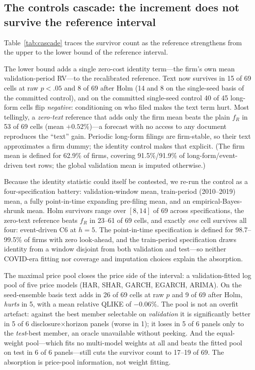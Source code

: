 \subsection{The controls cascade: the increment does not survive the reference interval}
\label{sec:results-cascade}

Table~\ref{tab:cascade} traces the survivor count as the reference strengthens from the upper to the lower bound of the reference interval.

The lower bound adds a single zero-cost identity term---the firm's own mean validation-period RV---to the recalibrated reference. Text now survives in 15 of 69 cells at raw $p<.05$ and 8 of 69 after Holm (14 and 8 on the single-seed basis of the committed control), and on the committed single-seed control 40 of 45 long-form cells flip \emph{negative}: conditioning on who filed makes the text term hurt. Most tellingly, a \emph{zero-text} reference that adds only the firm mean beats the plain $f_R$ in 53 of 69 cells (mean $+0.52\%$)---a forecast with no access to any document reproduces the ``text'' gain. Periodic long-form filings are firm-stable, so their text approximates a firm dummy; the identity control makes that explicit. (The firm mean is defined for 62.9\% of firms, covering 91.5\%/91.9\% of long-form/event-driven test rows; the global validation mean is imputed otherwise.)

Because the identity statistic could itself be contested, we re-run the control as a four-specification battery: validation-window mean, train-period (2010--2019) mean, a fully point-in-time expanding pre-filing mean, and an empirical-Bayes-shrunk mean. Holm survivors range over $[8,14]$ of 69 across specifications, the zero-text reference beats $f_R$ in 23--61 of 69 cells, and exactly \emph{one} cell survives all four: event-driven C6 at $h{=}5$. The point-in-time specification is defined for 98.7--99.5\% of firms with zero look-ahead, and the train-period specification draws identity from a window disjoint from both validation and test---so neither COVID-era fitting nor coverage and imputation choices explain the absorption.

The maximal price pool closes the price side of the interval: a validation-fitted log pool of five price models (HAR, SHAR, GARCH, EGARCH, ARIMA). On the seed-ensemble basis text adds in 26 of 69 cells at raw $p$ and 9 of 69 after Holm, \emph{hurts} in 5, with a mean relative QLIKE of $-0.06\%$. The pool is not an overfit artefact: against the best member selectable on \emph{validation} it is significantly better in 5 of 6 disclosure$\times$horizon panels (worse in 1); it loses in 5 of 6 panels only to the \emph{test}-best member, an oracle unavailable without peeking. And the equal-weight pool---which fits no multi-model weights at all and beats the fitted pool on test in 6 of 6 panels---still cuts the survivor count to 17--19 of 69. The absorption is price-pool information, not weight fitting.

